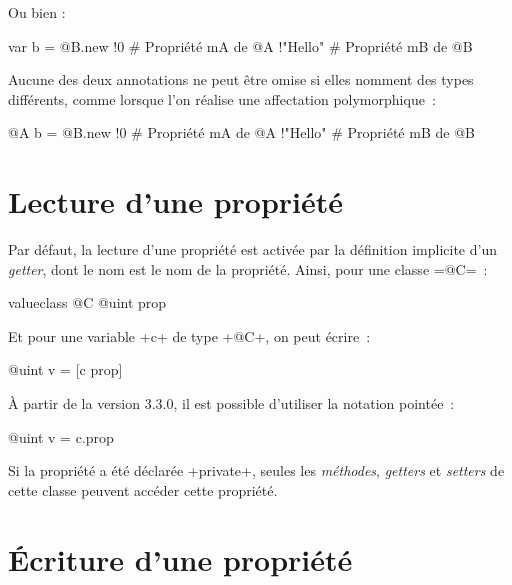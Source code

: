 Ou bien :
\begin{galgas}
var b = @B.new {
  !0 # Propriété mA de @A
  !"Hello" # Propriété mB de @B
}
\end{galgas}

Aucune des deux annotations ne peut être omise si elles nomment des types différents, comme lorsque l'on réalise une affectation polymorphique~:

\begin{galgas}
@A b = @B.new {
  !0 # Propriété mA de @A
  !"Hello" # Propriété mB de @B
}
\end{galgas}













\section{Lecture d'une propriété}

Par défaut, la lecture d'une propriété est activée par la définition implicite d'un \emph{getter}, dont le nom est le nom de la propriété. Ainsi, pour une classe \ggs=@C=~:

\begin{galgas}
valueclass @C {
  @uint prop
}
\end{galgas}

Et pour une variable \ggs+c+ de type \ggs+@C+, on peut écrire~:

\begin{galgas}
@uint v = [c prop]
\end{galgas}

À partir de la version 3.3.0, il est possible d'utiliser la notation pointée~:
\begin{galgas}
@uint v = c.prop
\end{galgas}

Si la propriété a été déclarée \ggs+private+, seules les \emph{méthodes}, \emph{getters} et \emph{setters} de cette classe peuvent accéder cette propriété.








\section{Écriture d'une propriété}


